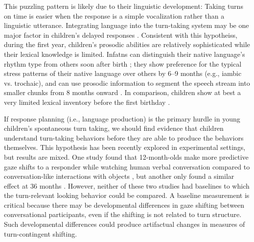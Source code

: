 \documentclass[authoryear, 12pt]{elsarticle}
\begin{document}
This puzzling pattern is likely due to their linguistic development: Taking turns on time is easier when the response is a simple vocalization rather than a linguistic utterance. Integrating language into the turn-taking system may be one major factor in children's delayed responses \citep{casillas2016}. Consistent with this hypotheiss, during the first year, children's prosodic abilities are relatively sophisticated while their lexical knowledge is limited. Infatns can distinguish their native language's rhythm type from others soon after birth \citep{mehler1988, nazzi2003}; they 
show preference for the typical stress patterns of their native language over others by 6--9 months (e.g., iambic vs. trochaic), and can use prosodic information to segment the speech stream into smaller chunks from 8 months onward \citep{johnson2001, morgan1995}. In comparison, children show at best a very limited lexical inventory before the first birthday \citep{bergelson2013, shi2010}. 

If response planning (i.e., language production) is the primary hurdle in young children's spontaneous turn taking, we should find evidence that children understand turn-taking behaviors before they are able to produce the behaviors themselves. This hypothesis has been recently explored in experimental settings, but results are mixed. One study found that 12-month-olds make more predictive gaze shifts to a responder while watching human verbal conversation compared to conversation-like interactions with objects \citep{bakker2011}, but another only found a similar effect at 36 months \citep{hofsten2009}. However, neither of these two studies had baselines to which the turn-relevant looking behavior could be compared. A baseline measurement is critical because there may be developmental differences in gaze shifting between conversational participants, even if the shifting is not related to turn structure. Such developmental differences could produce artifactual changes in measures of turn-contingent shifting. 
\end{document}
